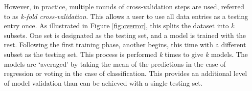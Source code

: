 However, in practice, multiple rounds of cross-validation steps are used,
referred to as \textit{k-fold cross-validation}. This allows a user to use all
data entries as a testing entry once.  As illustrated in Figure
\ref{fig:cverror}, this splits the dataset into \textit{k} subsets. One set is
designated as the testing set, and a model is trained with the rest. Following
the first training phase, another begins, this time with a different subset as
the testing set.  This process is performed \textit{k} times to give \textit{k}
models. The models are `averaged' by taking the mean of the predictions in the
case of regression or voting in the case of classification.  This provides an
additional level of model validation than can be achieved with a single testing
set.

